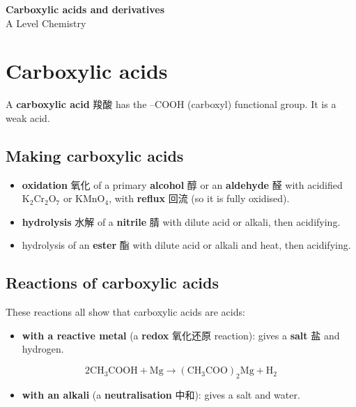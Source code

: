 \documentclass[11pt]{article}
\begin{document}
\begin{center}
  {\LARGE\bfseries Carboxylic acids and derivatives}\\[0.35em]
  {\large A Level Chemistry}
\end{center}
\vspace{0.6em}

\section*{Carboxylic acids}

A \textbf{carboxylic acid} 羧酸 has the $\text{–COOH}$ (carboxyl) functional group. It is a weak acid.

\subsection*{Making carboxylic acids}

\begin{itemize}
\item \textbf{oxidation} 氧化 of a primary \textbf{alcohol} 醇 or an \textbf{aldehyde} 醛 with acidified $\text{K}_2\text{Cr}_2\text{O}_7$ or $\text{KMnO}_4$, with \textbf{reflux} 回流 (so it is fully oxidised).

\item \textbf{hydrolysis} 水解 of a \textbf{nitrile} 腈 with dilute acid or alkali, then acidifying.

\item hydrolysis of an \textbf{ester} 酯 with dilute acid or alkali and heat, then acidifying.

\end{itemize}

\subsection*{Reactions of carboxylic acids}

These reactions all show that carboxylic acids are acids:

\begin{itemize}
\item \textbf{with a reactive metal} (a \textbf{redox} 氧化还原 reaction): gives a \textbf{salt} 盐 and hydrogen.

\end{itemize}

\[
2\text{CH}_3\text{COOH} + \text{Mg} \rightarrow (\text{CH}_3\text{COO})_2\text{Mg} + \text{H}_2
\]

\begin{itemize}
\item \textbf{with an alkali} (a \textbf{neutralisation} 中和): gives a salt and water.

\end{itemize}
\end{document}
